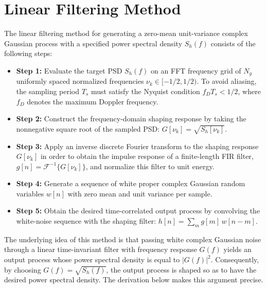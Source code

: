 \section{Linear Filtering Method}
\label{appendix:psd_method}

The linear filtering method for generating a zero-mean unit-variance complex Gaussian process with a specified power spectral density $S_h(f)$ consists of the following steps:
\begin{itemize}[label={}, leftmargin=0.5cm]

    \item \textbf{Step 1:}
    Evaluate the target \ac{PSD} $S_h(f)$ on an \acs{FFT} frequency grid of $N_g$ uniformly spaced normalized frequencies $\nu_k \in [-1/2, 1/2)$.
    To avoid aliasing, the sampling period $T_s$ must satisfy the Nyquist condition $f_D T_s < 1/2$, where $f_D$ denotes the maximum Doppler frequency.

    \item \textbf{Step 2:}
    Construct the frequency-domain shaping response by taking the nonnegative square root of the sampled \ac{PSD}: $G[\nu_k] = \sqrt{S_h[\nu_k]}$.

    \item \textbf{Step 3:}
    Apply an inverse discrete Fourier transform to the shaping response $G[\nu_k]$ in order to obtain the impulse response of a finite-length \acs{FIR} filter, $g[n] = \mathcal{F}^{-1}\{G[\nu_k]\}$, and normalize this filter to unit energy.

    \item \textbf{Step 4:}
    Generate a sequence of white proper complex Gaussian random variables $w[n]$ with zero mean and unit variance per sample.

    \item \textbf{Step 5:}
    Obtain the desired time-correlated output process by convolving the white-noise sequence with the shaping filter: $h[n] = \sum_m g[m]\, w[n-m]$.

\end{itemize}

The underlying idea of this method is that passing white complex Gaussian noise through a linear time-invariant filter with frequency response $G(f)$ yields an output process whose power spectral density is equal to $|G(f)|^2$.
Consequently, by choosing $G(f) = \sqrt{S_h(f)}$, the output process is shaped so as to have the desired power spectral density.
The derivation below makes this argument precise.

